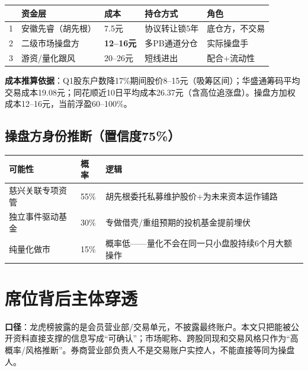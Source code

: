 \documentclass[a4paper,11pt,fontset=none]{ctexart}
\begin{document}
\begin{tabularx}{\textwidth}{L{0.5cm}L{3.5cm}L{2cm}L{2.5cm}X}
\toprule
 & \textbf{资金层} & \textbf{成本} & \textbf{持仓方式} & \textbf{角色} \\
 & 安徽先睿（胡先根） & 7.5元 & 协议转让锁5年 & 底仓方，不交易 \\
2 & 二级市场操盘方 & \textbf{12--16元} & 多PB通道分仓 & 实际操盘手 \\
3 & 游资/量化跟风 & 20--26元 & 短线进出 & 配合+流动性 \\
\bottomrule
\end{tabularx}

\textbf{成本推算依据}：Q1股东户数降17\%期间股价8--15元（吸筹区间）；华盛通筹码平均交易成本19.08元；同花顺近10日平均成本26.37元（含高位追涨盘）。操盘方加权成本12--16元，当前浮盈60--100\%。

\subsection*{操盘方身份推断（置信度75\%）}

\begin{tabularx}{\textwidth}{L{2cm}L{1.5cm}X}
\toprule
\textbf{可能性} & \textbf{概率} & \textbf{逻辑} \\
\midrule
慈兴关联专项资管 & 55\% & 胡先根委托私募维护股价+为未来资本运作铺路 \\
独立事件驱动基金 & 30\% & 专做借壳/重组预期的投机基金提前埋伏 \\
纯量化做市 & 15\% & 概率低——量化不会在同一只小盘股持续6个月大额操作 \\
\bottomrule
\end{tabularx}

\section{席位背后主体穿透}

\textbf{口径}：龙虎榜披露的是会员营业部/交易单元，不披露最终账户。本文只把能被公开资料直接支撑的信息写成“可确认”；市场昵称、跨股同现和交易风格只作为“高概率/风格推断”。券商营业部负责人不是交易账户实控人，不能直接等同为操盘人。
\end{document}
